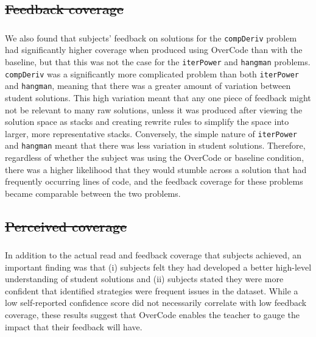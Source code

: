 \documentclass[12pt,twoside]{mitthesis}
\newcommand \codevar[1]{\texttt{#1}}
\providecommand{\DIFaddtex}[1]{{\protect\color{blue}\uwave{#1}}} %
\providecommand{\DIFdeltex}[1]{{\protect\color{red}\sout{#1}}}                      %
\providecommand{\DIFaddbegin}{} %
\providecommand{\DIFaddend}{} %
\providecommand{\DIFdelbegin}{} %
\providecommand{\DIFdelend}{} %
\providecommand{\DIFadd}[1]{\texorpdfstring{\DIFaddtex{#1}}{#1}} %
\providecommand{\DIFdel}[1]{\texorpdfstring{\DIFdeltex{#1}}{}} %
\begin{document}
{{{{{{{{{{\DIFdelbegin \subsection{\DIFdel{Feedback coverage}}
\addtocounter{subsection}{-1}%
\DIFdelend \DIFaddbegin \subsubsection{\DIFadd{Feedback coverage}}
\DIFaddend We also found that subjects' feedback on solutions for the \codevar{compDeriv} problem had significantly higher coverage when produced using OverCode than with the baseline, but that this was not the case for the \codevar{iterPower} and \codevar{hangman} problems. \codevar{compDeriv} was a significantly more complicated problem than both \codevar{iterPower} and \codevar{hangman}, meaning that there was a greater amount of variation between student solutions. This high variation meant that any one piece of feedback might not be relevant to many raw solutions, unless it was produced after viewing the solution space as stacks and creating rewrite rules to simplify the space into larger, more representative stacks. Conversely, the simple nature of \codevar{iterPower} and \codevar{hangman} meant that there was less variation in student solutions. Therefore, regardless of whether the subject was using the OverCode or baseline condition, there was a higher likelihood that they would stumble across a solution that had frequently occurring lines of code, and the feedback coverage for these problems became comparable between the two problems.

\DIFdelbegin \subsection{\DIFdel{Perceived coverage}}
\addtocounter{subsection}{-1}%
\DIFdelend \DIFaddbegin \subsubsection{\DIFadd{Perceived coverage}}
\DIFaddend In addition to the actual read and feedback coverage that subjects achieved, an important finding was that (i) subjects felt they had developed a better high-level understanding of student solutions and (ii) subjects stated they were more confident that identified strategies were frequent issues in the dataset. While a low self-reported confidence score did not necessarily correlate with low feedback coverage, these results suggest that OverCode enables the teacher to gauge the impact that their feedback will have.

}}}}}}}}}}
\end{document}
